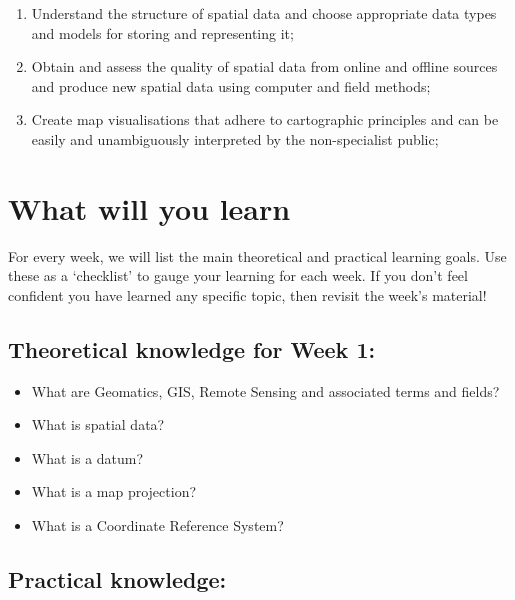 \documentclass[
  letterpaper,
  DIV=11,
  numbers=noendperiod]{scrreprt}
\providecommand{\tightlist}{%
  \setlength{\itemsep}{0pt}\setlength{\parskip}{0pt}}\usepackage{longtable,booktabs,array}
\begin{document}

\begin{enumerate}
\def\labelenumi{\arabic{enumi}.}
\item
  Understand the structure of spatial data and choose appropriate data
  types and models for storing and representing it;
\item
  Obtain and assess the quality of spatial data from online and offline
  sources and produce new spatial data using computer and field methods;
\item
  Create map visualisations that adhere to cartographic principles and
  can be easily and unambiguously interpreted by the non-specialist
  public;
\end{enumerate}

\section*{What will you learn}\label{what-will-you-learn}


For every week, we will list the main theoretical and practical learning
goals. Use these as a `checklist' to gauge your learning for each week.
If you don't feel confident you have learned any specific topic, then
revisit the week's material!

\subsection*{Theoretical knowledge for Week
1:}\label{theoretical-knowledge-for-week-1}

\begin{itemize}
\tightlist
\item
  What are Geomatics, GIS, Remote Sensing and associated terms and
  fields?
\item
  What is spatial data?
\item
  What is a datum?
\item
  What is a map projection?
\item
  What is a Coordinate Reference System?
\end{itemize}

\subsection*{Practical knowledge:}\label{practical-knowledge}
\end{document}
